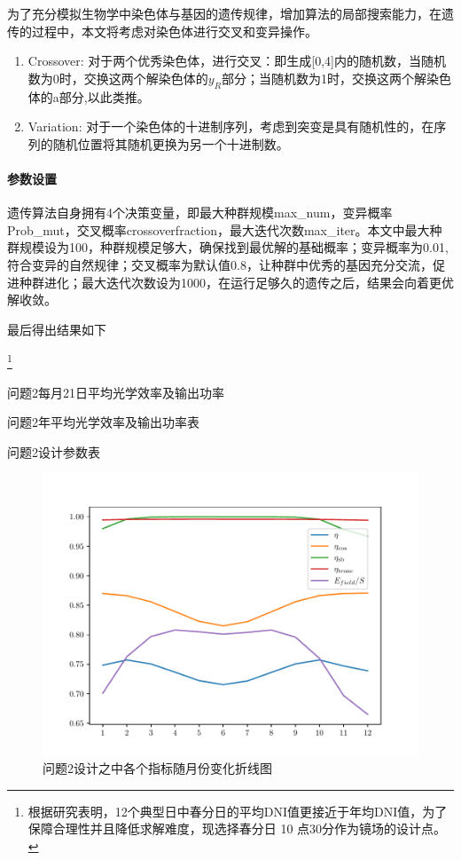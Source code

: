 	为了充分模拟生物学中染色体与基因的遗传规律，增加算法的局部搜索能力，在遗传的过程中，本文将考虑对染色体进行交叉和变异操作。
\begin{enumerate}
\item 
Crossover:
对于两个优秀染色体，进行交叉：即生成[0,4]内的随机数，当随机数为0时，交换这两个解染色体的\(y_{R}\)部分；当随机数为1时，交换这两个解染色体的a部分,以此类推。
\item 
Variation:
对于一个染色体的十进制序列，考虑到突变是具有随机性的，在序列的随机位置将其随机更换为另一个十进制数。
\end{enumerate}

\paragraph{参数设置}
遗传算法自身拥有4个决策变量，即最大种群规模max\_num，变异概率
Prob\_mut，交叉概率crossoverfraction，最大迭代次数max\_iter。本文中最大种群规模设为100，种群规模足够大，确保找到最优解的基础概率；变异概率为0.01,符合变异的自然规律；交叉概率为默认值0.8，让种群中优秀的基因充分交流，促进种群进化；最大迭代次数设为1000，在运行足够久的遗传之后，结果会向着更优解收敛。

最后得出结果如下

\footnote{根据研究表明，12个典型日中春分日的平均DNI值更接近于年均DNI值，为了保障合理性并且降低求解难度，现选择春分日 10 点30分作为镜场的设计点。}
%
\begin{table}[H]
\centering

\caption{\kaishu 问题2每月21日平均光学效率及输出功率}
\end{table}
%
\begin{table}[H]
\centering

\caption{\kaishu 问题2年平均光学效率及输出功率表}
\end{table}
%
\begin{table}[H]
\centering

\caption{\kaishu 问题2设计参数表}
\end{table}
%
\begin{figure}[H]
\centering
\includegraphics[scale=0.5]{zhexiantu2.pdf}
\caption{\kaishu 问题2设计之中各个指标随月份变化折线图}\label{fig:zhexiantu2}
\end{figure}

